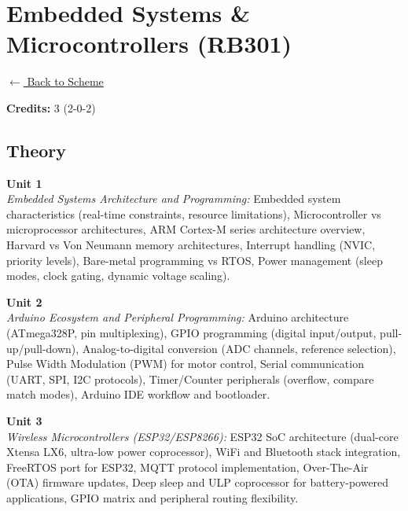 \section*{Embedded Systems \& Microcontrollers (RB301)}
\label{major:RB_3}

\noindent \small{\hyperref[main:scheme]{$\leftarrow$ Back to Scheme}} \vspace{0.5cm}

\noindent \textbf{Credits:} 3 (2-0-2)

\subsection*{Theory}
\noindent\textbf{Unit 1} \\
\textit{Embedded Systems Architecture and Programming:} Embedded system characteristics (real-time constraints, resource limitations), Microcontroller vs microprocessor architectures, ARM Cortex-M series architecture overview, Harvard vs Von Neumann memory architectures, Interrupt handling (NVIC, priority levels), Bare-metal programming vs RTOS, Power management (sleep modes, clock gating, dynamic voltage scaling).

\vspace{0.3cm}

\noindent\textbf{Unit 2} \\
\textit{Arduino Ecosystem and Peripheral Programming:} Arduino architecture (ATmega328P, pin multiplexing), GPIO programming (digital input/output, pull-up/pull-down), Analog-to-digital conversion (ADC channels, reference selection), Pulse Width Modulation (PWM) for motor control, Serial communication (UART, SPI, I2C protocols), Timer/Counter peripherals (overflow, compare match modes), Arduino IDE workflow and bootloader.

\vspace{0.3cm}

\noindent\textbf{Unit 3} \\
\textit{Wireless Microcontrollers (ESP32/ESP8266):} ESP32 SoC architecture (dual-core Xtensa LX6, ultra-low power coprocessor), WiFi and Bluetooth stack integration, FreeRTOS port for ESP32, MQTT protocol implementation, Over-The-Air (OTA) firmware updates, Deep sleep and ULP coprocessor for battery-powered applications, GPIO matrix and peripheral routing flexibility.

\vspace{0.3cm}

